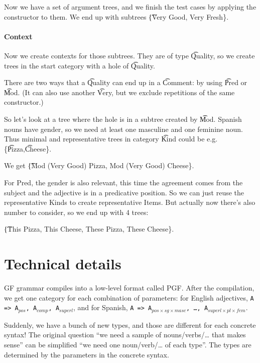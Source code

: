Now we have a set of argument trees, and we finish the test cases by applying the constructor to them. We end up with subtrees \t{\{Very Good, Very Fresh\}}.


\paragraph{Context} 

Now we create contexts for those subtrees. They are of type \t{Quality}, so we create trees in the start category with a hole of \t{Quality}.

There are two ways that a \t{Quality} can end up in a \t{Comment}: by using \t{Pred} or \t{Mod}. (It can also use another \t{Very}, but we exclude repetitions of the same constructor.) 

So let's look at a tree where the hole is in a subtree created by \t{Mod}.
Spanish nouns have gender, so we need at least one masculine and one feminine noun.
Thus minimal and representative trees in category \t{Kind} could be e.g. \{\t{Pizza},\t{Cheese}\}. 

We get \t{\{Mod (Very Good) Pizza, Mod (Very Good) Cheese\}}. 

For Pred, the gender is also relevant, this time the agreement comes from the subject and the adjective is in a predicative position. So we can just reuse the representative Kinds to create representative Items. 
But actually now there's also number to consider, so we end up with 4 trees:

 \t{\{This Pizza, This Cheese, These Pizza, These Cheese\}}.

\section{Technical details}

GF grammar compiles into a low-level format called PGF. After the
compilation, we get one category for each combination of parameters:
for English adjectives, \texttt{A => A$_{pos}$, A$_{comp}$,
A$_{superl}$}, and for Spanish, \texttt{A => A$_{pos×sg×masc}$, \dots,
A$_{superl×pl×fem}$}. 

Suddenly, we have a bunch of new types, and those are different for
each concrete syntax! The original question ``we need a sample of
nouns/verbs/… that makes sense'' can be simplified ``we need one
noun/verb/… of each type''. The types are determined by the parameters
in the concrete syntax. 

